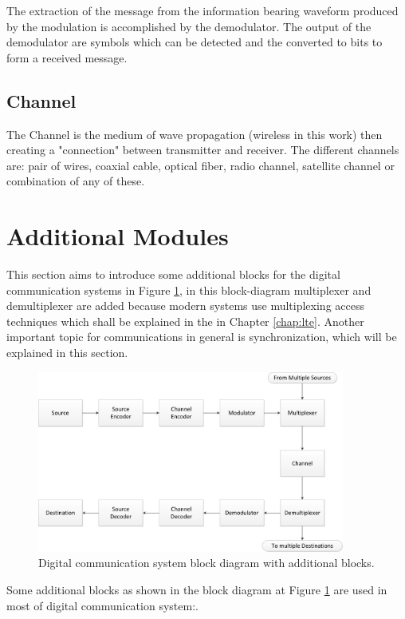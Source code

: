 The extraction of the message from the information bearing waveform produced by
the modulation is accomplished by the demodulator. The output of the demodulator
are symbols which can be detected and the converted to bits to form a received
message.

\subsection{Channel}

The Channel is the medium of wave propagation (wireless in this work) then
creating a "connection" between transmitter and receiver. The different channels
are: pair of wires, coaxial cable, optical fiber, radio channel, satellite
channel or combination of any of these.

\section{Additional Modules}

This section aims to introduce some additional blocks for the digital
communication systems in Figure \ref{fig:digicomplus}, in this block-diagram
multiplexer and demultiplexer are added because modern systems use multiplexing
access techniques which shall be explained in the in Chapter \ref{chap:lte}.
Another important topic for communications in general is synchronization, which
will be explained in this section.

\begin{figure}[htbp]
    \centering
    \includegraphics[width=0.9\textwidth]{./figures/digicom_plus}
    \caption{ Digital communication system block diagram with additional blocks.
    \label{fig:digicomplus}}
\end{figure}

Some additional blocks as shown in the block diagram  at Figure \ref{fig:digicomplus}
are used in most of digital communication system:.

